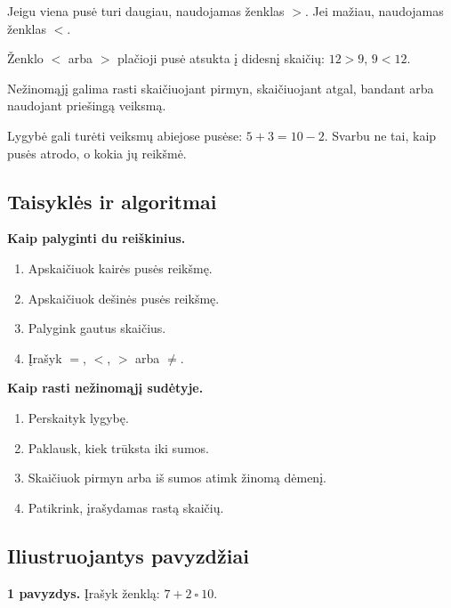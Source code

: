 \begin{savybe}
Jeigu viena pusė turi daugiau, naudojamas ženklas \(>\). Jei mažiau, naudojamas ženklas \(<\).
\end{savybe}

\begin{savybe}
Ženklo \(<\) arba \(>\) plačioji pusė atsukta į didesnį skaičių: \(12>9\), \(9<12\).
\end{savybe}

\begin{savybe}
Nežinomąjį galima rasti skaičiuojant pirmyn, skaičiuojant atgal, bandant arba naudojant priešingą veiksmą.
\end{savybe}

\begin{pastaba}
Lygybė gali turėti veiksmų abiejose pusėse: \(5+3=10-2\). Svarbu ne tai, kaip pusės atrodo, o kokia jų reikšmė.
\end{pastaba}

\subsection{Taisyklės ir algoritmai}

\textbf{Kaip palyginti du reiškinius.}
\begin{enumerate}
\item Apskaičiuok kairės pusės reikšmę.
\item Apskaičiuok dešinės pusės reikšmę.
\item Palygink gautus skaičius.
\item Įrašyk \(=\), \(<\), \(>\) arba \(\neq\).
\end{enumerate}

\textbf{Kaip rasti nežinomąjį sudėtyje.}
\begin{enumerate}
\item Perskaityk lygybę.
\item Paklausk, kiek trūksta iki sumos.
\item Skaičiuok pirmyn arba iš sumos atimk žinomą dėmenį.
\item Patikrink, įrašydamas rastą skaičių.
\end{enumerate}

\subsection{Iliustruojantys pavyzdžiai}

\textbf{1 pavyzdys.} Įrašyk ženklą: \(7+2\ \square\ 10\).

